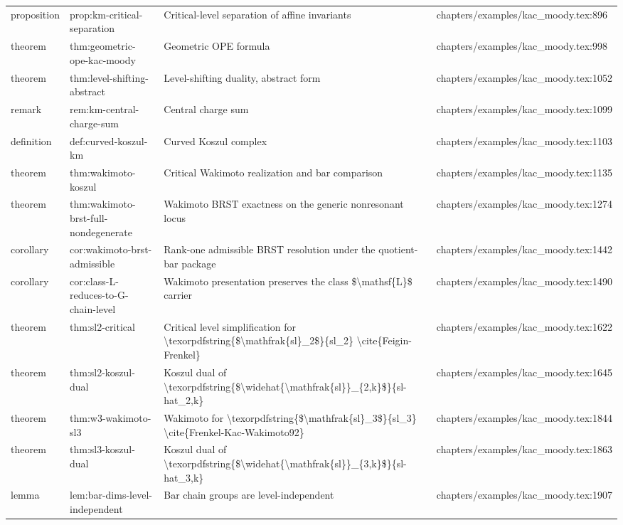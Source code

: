 \documentclass[11pt]{article}
\begin{document}
\begin{longtable}{L{0.10\textwidth}L{0.26\textwidth}L{0.42\textwidth}L{0.22\textwidth}}
proposition & prop:km-critical-separation & Critical-level separation of affine invariants & chapters/examples/kac\_moody.tex:896\\
theorem & thm:geometric-ope-kac-moody & Geometric OPE formula & chapters/examples/kac\_moody.tex:998\\
theorem & thm:level-shifting-abstract & Level-shifting duality, abstract form & chapters/examples/kac\_moody.tex:1052\\
remark & rem:km-central-charge-sum & Central charge sum & chapters/examples/kac\_moody.tex:1099\\
definition & def:curved-koszul-km & Curved Koszul complex & chapters/examples/kac\_moody.tex:1103\\
theorem & thm:wakimoto-koszul & Critical Wakimoto realization and bar comparison & chapters/examples/kac\_moody.tex:1135\\
theorem & thm:wakimoto-brst-full-nondegenerate & Wakimoto BRST exactness on the generic nonresonant locus & chapters/examples/kac\_moody.tex:1274\\
corollary & cor:wakimoto-brst-admissible & Rank-one admissible BRST resolution under the quotient-bar package & chapters/examples/kac\_moody.tex:1442\\
corollary & cor:class-L-reduces-to-G-chain-level & Wakimoto presentation preserves the class \$\textbackslash{}mathsf\{L\}\$ carrier & chapters/examples/kac\_moody.tex:1490\\
theorem & thm:sl2-critical & Critical level simplification for \textbackslash{}texorpdfstring\{\$\textbackslash{}mathfrak\{sl\}\_2\$\}\{sl\_2\} \textbackslash{}cite\{Feigin-Frenkel\} & chapters/examples/kac\_moody.tex:1622\\
theorem & thm:sl2-koszul-dual & Koszul dual of \textbackslash{}texorpdfstring\{\$\textbackslash{}widehat\{\textbackslash{}mathfrak\{sl\}\}\_\{2,k\}\$\}\{sl-hat\_2,k\} & chapters/examples/kac\_moody.tex:1645\\
theorem & thm:w3-wakimoto-sl3 & Wakimoto for \textbackslash{}texorpdfstring\{\$\textbackslash{}mathfrak\{sl\}\_3\$\}\{sl\_3\} \textbackslash{}cite\{Frenkel-Kac-Wakimoto92\} & chapters/examples/kac\_moody.tex:1844\\
theorem & thm:sl3-koszul-dual & Koszul dual of \textbackslash{}texorpdfstring\{\$\textbackslash{}widehat\{\textbackslash{}mathfrak\{sl\}\}\_\{3,k\}\$\}\{sl-hat\_3,k\} & chapters/examples/kac\_moody.tex:1863\\
lemma & lem:bar-dims-level-independent & Bar chain groups are level-independent & chapters/examples/kac\_moody.tex:1907\\

\end{longtable}
\end{document}
